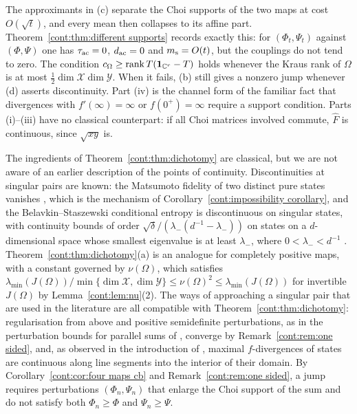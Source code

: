 The approximants in (c) separate the Choi supports of the two maps at cost $O(\sqrt t)$, and every mean then collapses to its affine part. Theorem~\ref{cont:thm:different supports} records exactly this: for $(\Phi_t,\Psi_t)$ against $(\Phi,\Psi)$ one has $\tau_{\rm ac}=0$, $d_{\rm ac}=0$ and $m_{\rm s}=O(t)$, but the couplings do not tend to zero. The condition $c_\Omega\geq\operatorname{rank} T(\mathbf{1}_{\mathbb{C}^r}-T)$ holds whenever the Kraus rank of $\Omega$ is at most $\frac12\dim\mathcal{X}\dim\mathcal{Y}$. When it fails, (b) still gives a nonzero jump whenever (d) asserts discontinuity. Part (iv) is the channel form of the familiar fact that divergences with $f'(\infty)=\infty$ or $f(0^+)=\infty$ require a support condition. Parts (i)--(iii) have no classical counterpart: if all Choi matrices involved commute, $\widehat F$ is continuous, since $\sqrt{xy}$ is.

The ingredients of Theorem~\ref{cont:thm:dichotomy} are classical, but we are not aware of an earlier description of the points of continuity. Discontinuities at singular pairs are known: the Matsumoto fidelity of two distinct pure states vanishes \cite{cree2020fidelity}, which is the mechanism of Corollary~\ref{cont:impossibility corollary}, and the Belavkin--Staszewski conditional entropy is discontinuous on singular states, with continuity bounds of order $\sqrt\delta/(\lambda_-(d^{-1}-\lambda_-))$ on states on a $d$-dimensional space whose smallest eigenvalue is at least $\lambda_-$, where $0<\lambda_-<d^{-1}$ \cite{BluhmCapelGondolfPerezHernandez2023}. Theorem~\ref{cont:thm:dichotomy}(a) is an analogue for completely positive maps, with a constant governed by $\nu(\Omega)$, which satisfies $\lambda_{\min}(J(\Omega))/\min\{\dim\mathcal{X},\dim\mathcal{Y}\}\leq\nu(\Omega)^2\leq\lambda_{\min}(J(\Omega))$ for invertible $J(\Omega)$ by Lemma~\ref{cont:lem:nu}(2). The ways of approaching a singular pair that are used in the literature are all compatible with Theorem~\ref{cont:thm:dichotomy}: regularisation from above \cite{KuboAndo1980,AndoLiMathias2004} and positive semidefinite perturbations, as in the perturbation bounds for parallel sums of \cite{LuoSongXu2018}, converge by Remark~\ref{cont:rem:one sided}, and, as observed in the introduction of \cite{Matsumoto2018newf}, maximal $f$-divergences of states are continuous along line segments into the interior of their domain. By Corollary~\ref{cont:cor:four maps cb} and Remark~\ref{cont:rem:one sided}, a jump requires perturbations $(\Phi_n,\Psi_n)$ that enlarge the Choi support of the sum and do not satisfy both $\Phi_n\geq\Phi$ and $\Psi_n\geq\Psi$.

